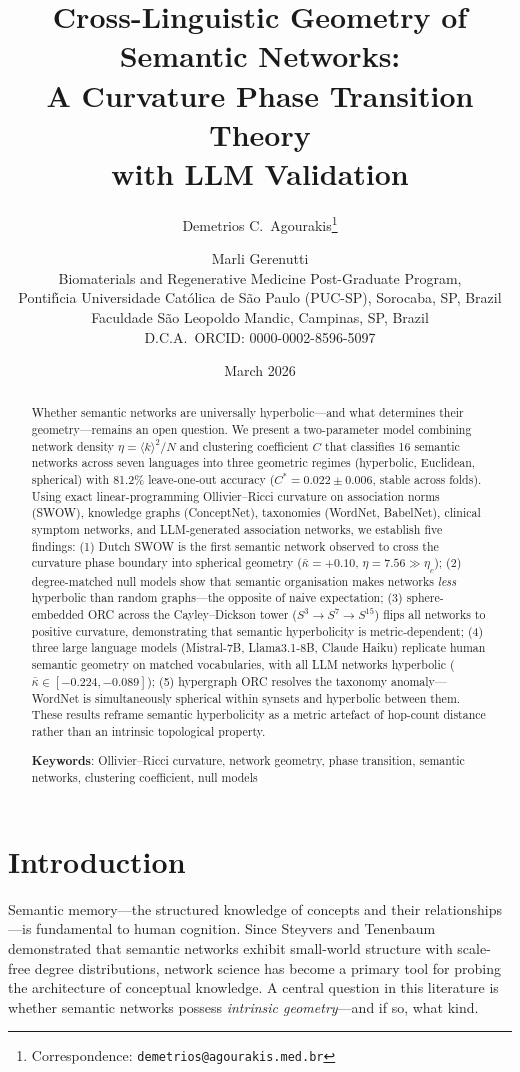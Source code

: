 \documentclass[11pt,a4paper]{article}
\title{Cross-Linguistic Geometry of Semantic Networks:\\A Curvature Phase Transition Theory\\with LLM Validation}
\author{%
  Demetrios C.\ Agourakis\thanks{Correspondence: \texttt{demetrios@agourakis.med.br}}%
  \and
  Marli Gerenutti%
  \\[6pt]
  \small Biomaterials and Regenerative Medicine Post-Graduate Program,\\
  \small Pontif\'{\i}cia Universidade Cat\'olica de S\~ao Paulo (PUC-SP),
         Sorocaba, SP, Brazil\\
  \small Faculdade S\~ao Leopoldo Mandic, Campinas, SP, Brazil\\[3pt]
  \small D.C.A.\ ORCID: 0000-0002-8596-5097
}
\date{March 2026}
\newcommand{\kbar}{\bar{\kappa}}
\newcommand{\kavg}{\langle k \rangle}
\newcommand{\etac}{\eta_c}
\newcommand{\Cstar}{C^*}
\begin{document}
\maketitle

\begin{abstract}
Whether semantic networks are universally hyperbolic---and what determines their geometry---remains an open question. We present a two-parameter model combining network density $\eta = \kavg^2/N$ and clustering coefficient $C$ that classifies 16 semantic networks across seven languages into three geometric regimes (hyperbolic, Euclidean, spherical) with 81.2\% leave-one-out accuracy ($\Cstar = 0.022 \pm 0.006$, stable across folds). Using exact linear-programming Ollivier--Ricci curvature on association norms (SWOW), knowledge graphs (ConceptNet), taxonomies (WordNet, BabelNet), clinical symptom networks, and LLM-generated association networks, we establish five findings: (1) Dutch SWOW is the first semantic network observed to cross the curvature phase boundary into spherical geometry ($\kbar = +0.10$, $\eta = 7.56 \gg \etac$); (2) degree-matched null models show that semantic organisation makes networks \emph{less} hyperbolic than random graphs---the opposite of naive expectation; (3) sphere-embedded ORC across the Cayley--Dickson tower ($S^3 \to S^7 \to S^{15}$) flips all networks to positive curvature, demonstrating that semantic hyperbolicity is metric-dependent; (4) three large language models (Mistral-7B, Llama3.1-8B, Claude Haiku) replicate human semantic geometry on matched vocabularies, with all LLM networks hyperbolic ($\kbar \in [-0.224, -0.089]$); (5) hypergraph ORC resolves the taxonomy anomaly---WordNet is simultaneously spherical within synsets and hyperbolic between them. These results reframe semantic hyperbolicity as a metric artefact of hop-count distance rather than an intrinsic topological property.

\medskip\noindent
\textbf{Keywords}: Ollivier--Ricci curvature, network geometry, phase transition, semantic networks, clustering coefficient, null models
\end{abstract}

\section{Introduction}
\label{sec:intro}

Semantic memory---the structured knowledge of concepts and their relationships---is fundamental to human cognition. Since Steyvers and Tenenbaum~\cite{steyvers2005large} demonstrated that semantic networks exhibit small-world structure with scale-free degree distributions, network science has become a primary tool for probing the architecture of conceptual knowledge. A central question in this literature is whether semantic networks possess \emph{intrinsic geometry}---and if so, what kind.
\end{document}
